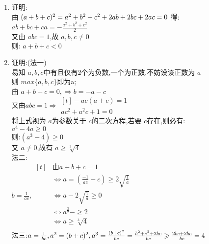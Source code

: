 \documentclass[class=ctexart,crop=false]{standalone}
\begin{document}
\begin{enumerate}[label=(\arabic*)]
    \item 证明:\\
    由 $(a+b+c)^2=a^2+b^2+c^2+2ab+2bc+2ac=0\\$
    得: $ab+bc+ca=-\frac{a^2+b^2+c^2}{2}$\\
    又由 $abc=1$,故 $a,b,c \neq 0$\\
    则: $a+b+c<0$
    \item 证明:(法一)\\
    易知 $a,b,c$中有且仅有2个为负数,一个为正数,不妨设该正数为 $a$\\
    则 $max\{a,b,c\}$即为a;\\
    由 $a+b+c=0,\Rightarrow b=-a-c$\\
    又由$abc=1 \Rightarrow \begin{aligned}[t]
        -ac(a+c)=1\\
        ac^2+a^2c+1=0
    \end{aligned} $\\
    将上式视为 $a$为参数关于 $c$的二次方程,若要 $c$存在,则必有:\\
    $a^4-4a\geqslant 0$\\
    则:$(a^3-4)\geqslant 0$\\
    又 $a\neq 0$,故有 $a \geqslant \sqrt[3]{4}$\\
    法二:\\
    $b=\frac{1}{ac},\begin{aligned}[t]
        & \text{由} a+b+c=1\\
       & \Leftrightarrow a=(\frac{-1}{ac}-c) \geqslant 2\sqrt{\frac{1}{a}}\\
        &\Leftrightarrow a- 2\sqrt{\frac{1}{a}}\geqslant 0\\
        &\Leftrightarrow a^\frac{3}{2}- \geqslant 2\\
        &\Leftrightarrow a \geqslant \sqrt[3]{4}\\
    \end{aligned} $\\
    法三:$a=\frac{1}{bc},a^2=(b+c)^2,\\
    a^3=\frac{(b+c)^2}{bc}=\frac{b^2+c^2+2bc}{bc}\geqslant \frac{2bc+2bc}{bc}=4$
\end{enumerate}
\end{document}
